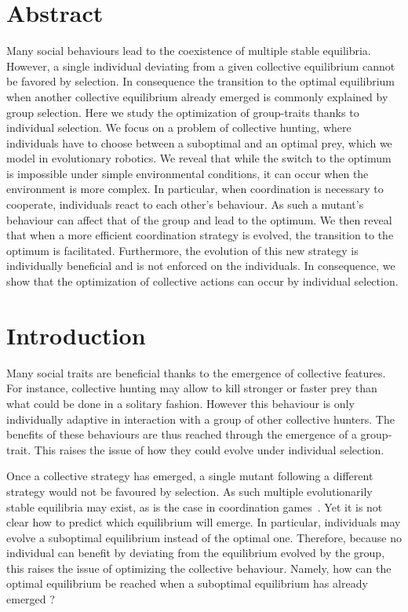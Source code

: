 \section{Abstract}
  Many social behaviours lead to the coexistence of multiple stable equilibria. However, a single individual deviating from a given collective equilibrium cannot be favored by selection. In consequence the transition to the optimal equilibrium when another collective equilibrium already emerged is commonly explained by group selection. Here we study the optimization of group-traits thanks to individual selection. We focus on a problem of collective hunting, where individuals have to choose between a suboptimal and an optimal prey, which we model in evolutionary robotics. We reveal that while the switch to the optimum is impossible under simple environmental conditions, it can occur when the environment is more complex. In particular, when coordination is necessary to cooperate, individuals react to each other's behaviour. As such a mutant's behaviour can affect that of the group and lead to the optimum. We then reveal that when a more efficient coordination strategy is evolved, the transition to the optimum is facilitated. Furthermore, the evolution of this new strategy is individually beneficial and is not enforced on the individuals. In consequence, we show that  the optimization of collective actions can occur by individual selection.


\section{Introduction}
  Many social traits are beneficial thanks to the emergence of collective features. For instance, collective hunting may allow to kill stronger or faster prey than what could be done in a solitary fashion. However this behaviour is only individually adaptive in interaction with a group of other collective hunters. The benefits of these behaviours are thus reached through the emergence of a group-trait. This raises the issue of how they could evolve under individual selection.

  Once a collective strategy has emerged, a single mutant following a different strategy would not be favoured by selection. As such multiple evolutionarily stable equilibria may exist, as is the case in coordination games~\parencite{MaynardSmith1982a, Skyrms2004}. Yet it is not clear how to predict which equilibrium will emerge. In particular, individuals may evolve a suboptimal equilibrium instead of the optimal one. Therefore, because no individual can benefit by deviating from the equilibrium evolved by the group, this raises the issue of optimizing the collective behaviour. Namely, how can the optimal equilibrium be reached when a suboptimal equilibrium has already emerged ?

